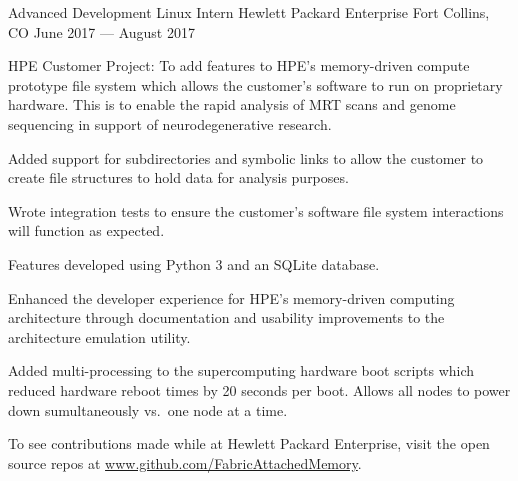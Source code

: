 

\begin{cventries}

  \cventry
    {Advanced Development Linux Intern} %
    {Hewlett Packard Enterprise} %
    {Fort Collins, CO} %
    {June 2017 --- August 2017} %
    {
      \begin{cvitems} %
        \item {HPE Customer Project:  To add features to HPE’s memory-driven compute prototype file system which allows the customer’s software to run on proprietary hardware. This is to enable the rapid analysis of MRT scans and genome sequencing in support of neurodegenerative research.}
        \item {Added support for subdirectories and symbolic links to allow the customer to create file structures to hold data for analysis purposes.}
        \item {Wrote integration tests to ensure the customer's software file system interactions will function as expected.}
        \item {Features developed using Python 3 and an SQLite database.}
        \item {Enhanced the developer experience for HPE's memory-driven computing architecture through documentation and usability improvements to the architecture emulation utility.}
        \item {Added multi-processing to the supercomputing hardware boot scripts which reduced hardware reboot times by 20 seconds per boot. Allows all nodes to power down sumultaneously vs.\ one node at a time.}
        \item {To see contributions made while at Hewlett Packard Enterprise, visit the open source repos at \url{www.github.com/FabricAttachedMemory}.} 
      \end{cvitems}
    }



\end{cventries}
